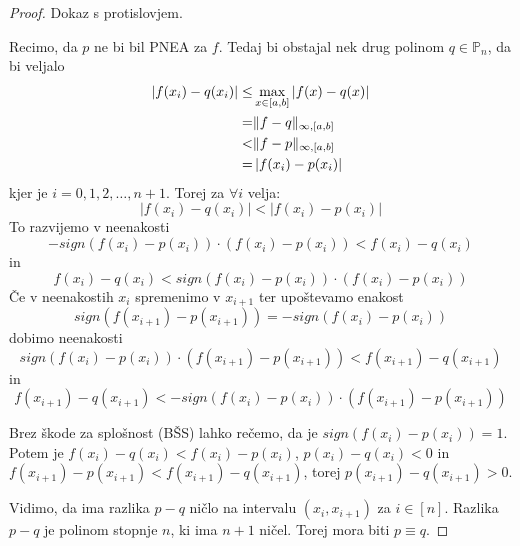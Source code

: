 \documentclass[a4paper,12pt]{article}
\DeclarePairedDelimiter\norm{\lVert}{\rVert}
\theoremstyle{definition}
\theoremstyle{remark}
\newcommand{\Pp}{\mathbb{P}}
\begin{document}
\begin{proof}
    Dokaz s protislovjem.

    Recimo, da $p$ ne bi bil PNEA za $f$. Tedaj bi obstajal nek drug polinom $q \in \Pp_n$, da bi veljalo
    \begin{align*}
        \left| f(x_i) - q(x_i) \right| \leq& \max_{x \in [a, b]} \left| f(x) - q(x) \right| \\
                             =& \norm{f - q}_{\infty, [a, b]} \\
                             <& \norm{f - p}_{\infty, [a, b]} \\
                             =& \left| f(x_i) - p(x_i) \right|
    \end{align*}
    kjer je $i = 0, 1, 2, \dots, n+1$.
    Torej za $\forall i $ velja:
    \begin{equation*}
        \left| f(x_i) - q(x_i) \right| < \left| f(x_i) - p(x_i) \right|
    \end{equation*}
    To razvijemo v neenakosti
    \begin{equation*}
        - sign(f(x_i) - p(x_i)) \cdot (f(x_i) - p(x_i)) < f(x_i) - q(x_i)
    \end{equation*}
    in
    \begin{equation*}
        f(x_i) - q(x_i) < sign(f(x_i) - p(x_i)) \cdot (f(x_i) - p(x_i))
    \end{equation*}
    Če v neenakostih $x_i$ spremenimo v $x_{i+1}$ ter upoštevamo enakost
    \begin{equation*}
        sign(f(x_{i+1}) - p(x_{i+1})) = - sign(f(x_i) - p(x_i))
    \end{equation*}
    dobimo neenakosti
    \begin{equation*}
        sign(f(x_i) - p(x_i)) \cdot (f(x_{i+1}) - p(x_{i+1})) < f(x_{i+1}) - q(x_{i+1})
    \end{equation*}
    in
    \begin{equation*}
        f(x_{i+1}) - q(x_{i+1}) < - sign(f(x_i) - p(x_i)) \cdot (f(x_{i+1}) - p(x_{i+1}))
    \end{equation*}

    Brez škode za splošnost (BŠS) lahko rečemo, da je $sign(f(x_i) - p(x_i)) = 1$. Potem je $f(x_i) - q(x_i) < f(x_i) - p(x_i)$, $p(x_i) - q(x_i) < 0$ in
    $f(x_{i+1}) - p(x_{i+1}) < f(x_{i+1}) - q(x_{i+1})$, torej $p(x_{i+1}) - q(x_{i+1}) > 0$.

    Vidimo, da ima razlika $p-q$ ničlo na intervalu $(x_i, x_{i+1})$ za $i \in [n]$. Razlika $p-q$ je polinom stopnje $n$, ki ima $n+1$ ničel.
    Torej mora biti $p \equiv q$.
\end{proof}
\end{document}
